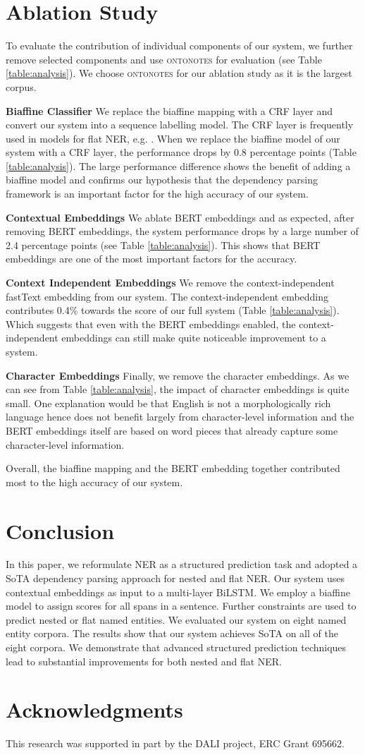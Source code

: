 \documentclass[11pt,a4paper]{article}
\newcommand{\ACRO}[1]{\textsc{#1}}
\newcommand{\ONTONOTES}{\ACRO{ontonotes}}
\begin{document}
\section{Ablation Study}
To evaluate the contribution of individual components of our system, we further remove selected components and use {\ONTONOTES} for evaluation (see Table \ref{table:analysis}). We choose {\ONTONOTES} for our ablation study as it is the largest corpus.  

\textbf{Biaffine Classifier} We  replace the biaffine mapping with a CRF layer and convert our system into a sequence labelling model. The CRF layer is frequently used in models for flat NER, e.g. \cite{glample2016-ner}. When we replace the biaffine model of  our system with a CRF layer, the performance drops by 0.8 percentage points (Table \ref{table:analysis}). The large performance difference shows the benefit of adding a biaffine model and confirms our hypothesis that the dependency parsing framework is an important factor for the high accuracy of our system. 

\textbf{Contextual Embeddings} We ablate BERT embeddings and as expected, after removing BERT embeddings, the system performance drops by a large number of 2.4 percentage points (see Table \ref{table:analysis}). This shows that BERT embeddings are one of the most important factors for the accuracy.

\textbf{Context Independent Embeddings} We remove the context-independent fastText embedding from our system. The context-independent embedding contributes 0.4\% towards the score of our full system (Table \ref{table:analysis}). Which suggests that even with the BERT embeddings enabled, the context-independent embeddings can still make quite noticeable improvement to a system. 

\textbf{Character Embeddings} Finally, we remove the character embeddings. As we can see from Table \ref{table:analysis}, the impact of character embeddings is quite small. One explanation would be that English is not a morphologically rich language hence does not benefit largely from character-level information and the BERT embeddings itself are based on word pieces that already capture some character-level information.

Overall, the biaffine mapping and the BERT embedding together contributed most to the high accuracy of our system.

\section{Conclusion}
In this paper, we reformulate NER as a structured prediction task and adopted a SoTA dependency parsing approach for nested and flat NER. Our system uses contextual embeddings as input to a multi-layer BiLSTM. We employ a biaffine model to assign scores for all spans in a sentence. Further constraints are used to predict nested or flat named entities. We evaluated our system on eight named entity corpora. The results show that our system achieves SoTA on all of the eight corpora. We demonstrate that advanced structured prediction techniques lead to substantial improvements for both nested and flat NER.

\section*{Acknowledgments}
This research was supported in part by the DALI project, ERC Grant 695662.

\newpage


\end{document}
